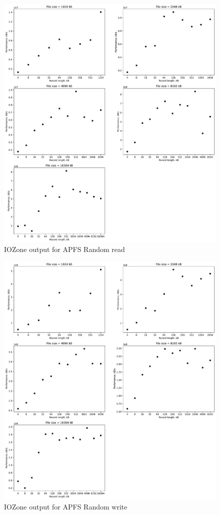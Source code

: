 \begin{figure}[!htb]
	\label{fig:app_bench_apfs_rnd_read}
	\begin{center}
		\includegraphics[width=1.0\textwidth]{figures/benchmarking/local/Random read.pdf}
	\end{center}
	\caption{IOZone output for APFS Random read}
\end{figure}

\begin{figure}[!htb]
	\label{fig:app_bench_fapfsrnd_write}
	\begin{center}
		\includegraphics[width=1.0\textwidth]{figures/benchmarking/local/Random write.pdf}
	\end{center}
	\caption{IOZone output for APFS Random write}
\end{figure}